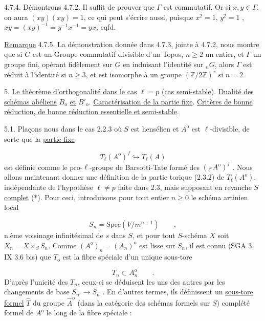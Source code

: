 4.7.4. Démontrons 4.7.2. Il suffit de prouver que $\Gamma$ est commutatif. Or si $x, y \in \Gamma$, on aura $(xy)(xy) = 1$, ce qui peut s'écrire aussi, puisque $x^2 = 1$, $y^2 = 1$ , $xy = (xy)^{-1} = y^{-1}x^{-1} = yx$, cqfd.

\underline{Remarque} 4.7.5. La démonstration donnée dans 4.7.3, jointe à 4.7.2, nous montre que si $G$ est un Groupe commutatif divisible d'un Topos, $n \geq 2$ un entier, et $\Gamma$ un groupe fini, opérant fidèlement sur $G$ en induisant l'identité sur ${}_nG$, alors $\Gamma$ est réduit à l'identité si $n \geq 3$, et est isomorphe à un groupe $(\mathbb{Z}/2\mathbb{Z})^r$ si $n=2$.




5. \underline{Le théorème d'orthogonalité dans le cas} $\ell = p$ (\underline{cas semi-stable}). \underline{Dualité des schémas abéliens} $B_{\mathrm{o}}$ \underline{et} $B'_{\mathrm{o}}$. \underline{Caractérisation de la partie fixe}. \underline{Critères de bonne réduction, de bonne réduction essentielle et semi-stable}.

5.1. Plaçons nous dans le cas 2.2.3 où $S$ est hensélien et $A^{\mathrm{o}}$ est $\ell$-divisible, de sorte que la \underline{partie fixe}

\begin{equation*}
T_\ell(A^{\mathrm{o}})^f \hookrightarrow T_\ell(A)
\end{equation*}
est définie comme le pro-$\ell$-groupe de Barsotti-Tate formé des $({}_{\ell^\nu}A^{\mathrm{o}})^f$ . Nous allons maintenant donner une définition de la partie torique (2.3.2) de $T_\ell(A^{\mathrm{o}})$, indépendante de l'hypothèse $\ell \neq p$ faite dans 2.3, mais supposant en revanche $S$ \underline{complet} (*). Pour ceci, introduisons pour tout entier $n \geq 0$ le schéma artinien local

\begin{equation}\tag{5.1.1}
S_n = \mathrm{Spec}(V/\underline{m}^{n+1}) \qquad ,
\end{equation}
n.ème voisinage infinitésimal de $s$ dans $S$, et pour tout $S$-schéma $X$ soit $X_n = X\times_S S_n$. Comme $(A^{\mathrm{o}})_n = (A_n)^{\mathrm{o}}$ est lisse sur $S_n$, il est connu (SGA 3 IX 3.6 bis) que $T_{\mathrm{o}}$ est la fibre spéciale d'un unique sous-tore

\begin{equation}\tag{5.1.2}
T_n \subset A_n^{\mathrm{o}} \qquad .
\end{equation}
D'après l'unicité des $T_n$, ceux-ci se déduisent les uns des autres par les changements de base $S_{n'} \longrightarrow S_n$ . En d'autres termes, ils définissent un \underline{sous-tore formel} $\hat{T}$ du groupe $\hat{A}^{\mathrm{o}}$ (dans la catégorie des schémas formels sur $S$) complété formel de $A^{\mathrm{o}}$ le long de la fibre spéciale :

